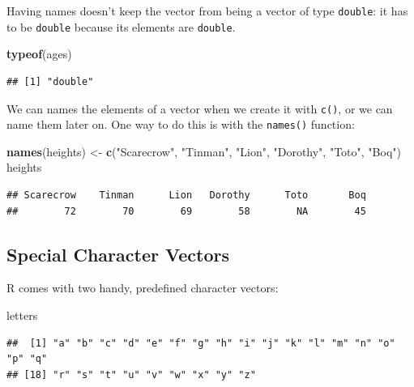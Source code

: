 \documentclass[]{book}
\makeatletter
\newenvironment{Shaded}{\begin{snugshade}}{\end{snugshade}}
\newcommand{\KeywordTok}[1]{\textcolor[rgb]{0.13,0.29,0.53}{\textbf{#1}}}
\newcommand{\StringTok}[1]{\textcolor[rgb]{0.31,0.60,0.02}{#1}}
\newcommand{\NormalTok}[1]{#1}
\newenvironment{kframe}{%
\medskip{}
\setlength{\fboxsep}{.8em}
 \def\at@end@of@kframe{}%
 \ifinner\ifhmode%
  \def\at@end@of@kframe{\end{minipage}}%
  \begin{minipage}{\columnwidth}%
 \fi\fi%
 \def\FrameCommand##1{\hskip\@totalleftmargin \hskip-\fboxsep
 \colorbox{shadecolor}{##1}\hskip-\fboxsep
     \hskip-\linewidth \hskip-\@totalleftmargin \hskip\columnwidth}%
 \MakeFramed {\advance\hsize-\width
   \@totalleftmargin\z@ \linewidth\hsize
   \@setminipage}}%
 {\par\unskip\endMakeFramed%
 \at@end@of@kframe}
\renewenvironment{Shaded}{\begin{kframe}}{\end{kframe}}
\theoremstyle{definition}
\theoremstyle{definition}
\theoremstyle{definition}
\theoremstyle{remark}
\makeatother
\begin{document}
Having names doesn't keep the vector from being a vector of type
\texttt{double}: it has to be \texttt{double} because its elements are
\texttt{double}.

\begin{Shaded}
\begin{Highlighting}[]
\KeywordTok{typeof}\NormalTok{(ages)}
\end{Highlighting}
\end{Shaded}

\begin{verbatim}
## [1] "double"
\end{verbatim}

We can names the elements of a vector when we create it with
\texttt{c()}, or we can name them later on. One way to do this is with
the \texttt{names()}
function:

\begin{Shaded}
\begin{Highlighting}[]
\KeywordTok{names}\NormalTok{(heights) <-}\StringTok{ }\KeywordTok{c}\NormalTok{(}\StringTok{"Scarecrow"}\NormalTok{, }\StringTok{"Tinman"}\NormalTok{, }\StringTok{"Lion"}\NormalTok{, }\StringTok{"Dorothy"}\NormalTok{, }\StringTok{"Toto"}\NormalTok{, }\StringTok{"Boq"}\NormalTok{)}
\NormalTok{heights}
\end{Highlighting}
\end{Shaded}

\begin{verbatim}
## Scarecrow    Tinman      Lion   Dorothy      Toto       Boq 
##        72        70        69        58        NA        45
\end{verbatim}

\subsection{Special Character Vectors}\label{special-character-vectors}

R comes with two handy, predefined character vectors:

\begin{Shaded}
\begin{Highlighting}[]
\NormalTok{letters}
\end{Highlighting}
\end{Shaded}

\begin{verbatim}
##  [1] "a" "b" "c" "d" "e" "f" "g" "h" "i" "j" "k" "l" "m" "n" "o" "p" "q"
## [18] "r" "s" "t" "u" "v" "w" "x" "y" "z"
\end{verbatim}
\end{document}
